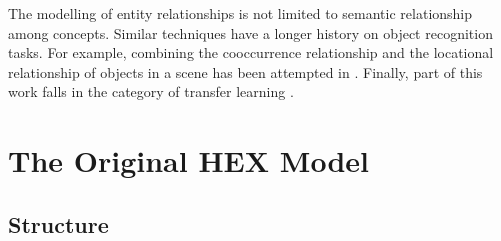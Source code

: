 \documentclass[11pt,a4paper]{book}
\begin{document}
The modelling of entity relationships is not limited to semantic relationship among concepts. Similar techniques have a longer history on object recognition tasks. For example, combining the cooccurrence relationship and the locational relationship of objects in a scene has been attempted in \cite{choi2012tree, galleguillos2008object}. Finally, part of this work falls in the category of transfer learning \cite{rohrbach2010helps}.

\chapter{The Original HEX Model}
\label{chap:original}
\section{Structure}
\end{document}
